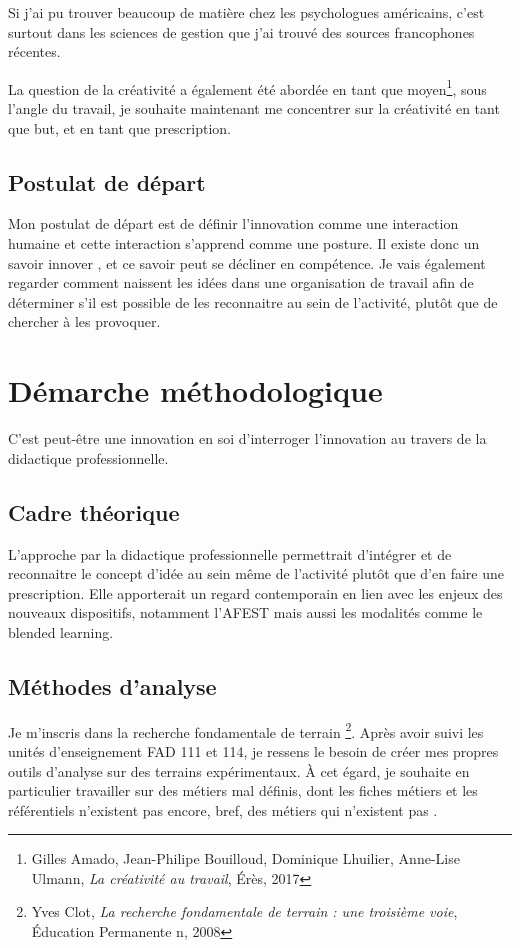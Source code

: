 \documentclass{article}
\begin{document}
Si j'ai pu trouver beaucoup de matière chez les psychologues américains, c'est surtout dans les sciences de gestion que j'ai trouvé des sources francophones récentes.

La question de la créativité a également été abordée en tant que moyen\footnote{Gilles Amado, Jean-Philipe Bouilloud, Dominique Lhuilier, Anne-Lise Ulmann, \textit{La créativité au travail}, Érès, 2017}, sous l'angle du travail, je souhaite maintenant me concentrer sur la créativité en tant que but, et en tant que prescription.

\subsection{Postulat de départ}

Mon postulat de départ est de définir l'innovation comme une interaction humaine et cette interaction s'apprend comme une posture. Il existe donc un \og savoir innover \fg{}, et ce savoir peut se décliner en compétence. 
Je vais également regarder comment naissent les idées dans une organisation de travail afin de déterminer s'il est possible de les reconnaitre au sein de l'activité, plutôt que de chercher à les provoquer. 

\section{Démarche méthodologique}

C'est peut-être une innovation en soi d'interroger l'innovation au travers de la didactique professionnelle.

\subsection{Cadre théorique}

L'approche par la didactique professionnelle permettrait d'intégrer et de reconnaitre le concept d'idée au sein même de l'activité plutôt que d'en faire une prescription. Elle apporterait un regard contemporain en lien avec les enjeux des nouveaux dispositifs, notamment l'AFEST mais aussi les modalités comme le blended learning.

\subsection{Méthodes d'analyse}

Je m'inscris dans la recherche fondamentale de terrain \footnote{Yves Clot, \emph{La recherche fondamentale de terrain : une troisième voie}, Éducation Permanente n, 2008}. Après avoir suivi les unités d'enseignement FAD 111 et 114, je ressens le besoin de créer mes propres outils d'analyse sur des terrains expérimentaux. À cet égard, je souhaite en particulier travailler sur des métiers mal définis, dont les fiches métiers et les référentiels n'existent pas encore, bref, des métiers \og qui n'existent pas \fg{}.
\end{document}
